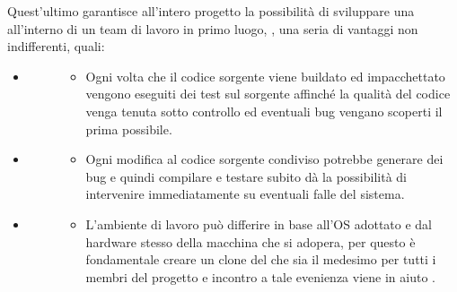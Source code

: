\documentclass[letterpaper,10pt,italian,openany,oneside]{sphinxmanual}
\begin{document}
Quest’ultimo garantisce all’intero progetto la possibilità di sviluppare una  all’interno di un team di lavoro in primo luogo, , una seria di vantaggi non indifferenti, quali:
\begin{itemize}
\item {} \begin{description}
\item[{}] \leavevmode\begin{itemize}
\item {} 
Ogni volta che il codice sorgente viene buildato ed impacchettato vengono eseguiti dei test sul sorgente affinché la qualità del codice venga tenuta sotto controllo ed eventuali bug vengano scoperti il prima possibile.

\end{itemize}

\end{description}

\item {} \begin{description}
\item[{}] \leavevmode\begin{itemize}
\item {} 
Ogni modifica al codice sorgente condiviso potrebbe generare dei bug e quindi compilare e testare subito dà la possibilità di intervenire immediatamente su eventuali falle del sistema.

\end{itemize}

\end{description}

\item {} \begin{description}
\item[{}] \leavevmode\begin{itemize}
\item {} 
L’ambiente di lavoro può differire in base all’OS adottato e dal hardware stesso della macchina che si adopera, per questo è fondamentale creare un clone del  che sia il medesimo per tutti i membri del progetto e incontro a tale evenienza viene in aiuto .

\end{itemize}


\end{description}
\end{itemize}
\end{document}
